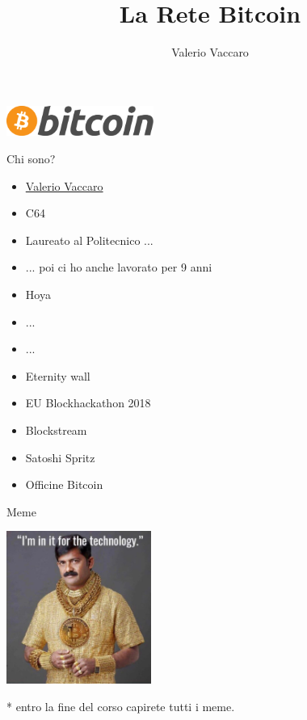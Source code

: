 \documentclass[aspectratio=169]{beamer}
\title{La Rete Bitcoin}
\author{Valerio Vaccaro}
\date{\displaydate{date}}
\begin{document}
\begin{frame}
    \titlepage
    \begin{center}
        \includegraphics[height=1cm]{logo.png}
    \end{center}
\end{frame}

\begin{frame}[noframenumbering]
    \tableofcontents
\end{frame}

\begin{frame}{Chi sono?}
    \begin{multicols}{2}
        \begin{itemize}
            \item \href{https://t.me/valeriovaccaro}{Valerio Vaccaro}
            \item C64
            \item Laureato al Politecnico ...
            \item ... poi ci ho anche lavorato per 9 anni
            \item Hoya
            \item ...
        \end{itemize}
        
        \begin{itemize}
            \item ...
            \item Eternity wall
            \item EU Blockhackathon 2018
            \item Blockstream
            \item Satoshi Spritz
            \item Officine Bitcoin
        \end{itemize}
    \end{multicols} 
\end{frame}

\begin{frame}{Meme}
    \begin{center}
        \includegraphics[height=5cm]{meme_1.jpg}
    \end{center}
    * entro la fine del corso capirete tutti i meme.
\end{frame}
\end{document}
